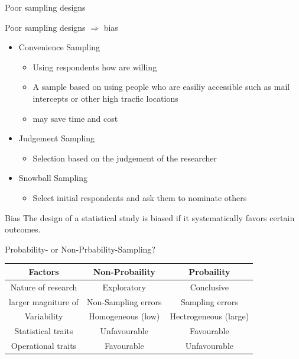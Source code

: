 \documentclass[10pt, compress]{beamer}
\begin{document}
\begin{frame}[t]{Poor sampling designs}
    \begin{block}{Poor sampling designs $\Rightarrow$ bias}
        \begin{itemize}
            \item Convenience Sampling
            \begin{itemize}
                \item Using respondents how are willing
                \item A sample based on using people who are easiliy accessible
                such as mail intercepts or other high tracfic locations
                \item may save time and cost
            \end{itemize}
            \item Judgement Sampling
            \begin{itemize}
                \item Selection based on the judgement of the researcher
            \end{itemize}
            \item Snowball Sampling
            \begin{itemize}
                \item Select initial respondents and ask them to nominate others
            \end{itemize}
        \end{itemize}
    \end{block}
    \begin{block}{Bias}
        The design of a statistical study is biased if it systematically favors certain outcomes.
    \end{block}
\end{frame}

\begin{frame}[t]{Probability- or Non-Prbability-Sampling?}
    \begin{table}
        \centering
        \begin{tabular}{|c|c|c|}
            \hline
            Factors & Non-Probaility & Probaility \\
            \hline
            \hline
            Nature of research & Exploratory & Conclusive \\
            larger magniture of & Non-Sampling errors & Sampling errors \\
            Variability & Homogeneous (low) & Hectrogeneous (large) \\
            Statistical traits & Unfavourable & Favourable \\
            Operational traits & Favourable & Unfavourable \\
            \hline
        \end{tabular}
    \end{table}
\end{frame}
\end{document}

